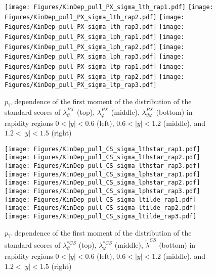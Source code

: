 \documentclass[12pt]{article}
\newcommand{\pT}{p_\mathrm{T}}
\newcommand{\absy}{\left |  y \right |}
\newcommand{\lamtildeCS}{\tilde{\lambda}^{\scriptscriptstyle CS}}
\newcommand{\lamthstarCS}{\lambda^{* \scriptscriptstyle CS}_\vartheta}
\newcommand{\lamphstarCS}{\lambda^{* \scriptscriptstyle CS}_\varphi}
\newcommand{\lamthPX}{\lambda^{\scriptscriptstyle PX}_\vartheta}
\newcommand{\lamphPX}{\lambda^{\scriptscriptstyle PX}_\varphi}
\newcommand{\lamthphPX}{\lambda^{\scriptscriptstyle PX}_{\vartheta \varphi}}
\begin{document}
\begin{figure}[htbp]
\centering
\texttt{[image: Figures/KinDep\_pull\_PX\_sigma\_lth\_rap1.pdf]}
\texttt{[image: Figures/KinDep\_pull\_PX\_sigma\_lth\_rap2.pdf]}
\texttt{[image: Figures/KinDep\_pull\_PX\_sigma\_lth\_rap3.pdf]}
\texttt{[image: Figures/KinDep\_pull\_PX\_sigma\_lph\_rap1.pdf]}
\texttt{[image: Figures/KinDep\_pull\_PX\_sigma\_lph\_rap2.pdf]}
\texttt{[image: Figures/KinDep\_pull\_PX\_sigma\_lph\_rap3.pdf]}
\texttt{[image: Figures/KinDep\_pull\_PX\_sigma\_ltp\_rap1.pdf]}
\texttt{[image: Figures/KinDep\_pull\_PX\_sigma\_ltp\_rap2.pdf]}
\texttt{[image: Figures/KinDep\_pull\_PX\_sigma\_ltp\_rap3.pdf]}
\caption{$\pT$ dependence of the first moment of the distribution of the
standard scores of $\lamthPX$ (top), $\lamphPX$ (middle), $\lamthphPX$ (bottom) in rapidity
regions $0<\absy<0.6$ (left), $0.6<\absy<1.2$ (middle), and $1.2<\absy<1.5$ (right)}
\end{figure}
\clearpage

\begin{figure}[htbp]
\centering
\texttt{[image: Figures/KinDep\_pull\_CS\_sigma\_lthstar\_rap1.pdf]}
\texttt{[image: Figures/KinDep\_pull\_CS\_sigma\_lthstar\_rap2.pdf]}
\texttt{[image: Figures/KinDep\_pull\_CS\_sigma\_lthstar\_rap3.pdf]}
\texttt{[image: Figures/KinDep\_pull\_CS\_sigma\_lphstar\_rap1.pdf]}
\texttt{[image: Figures/KinDep\_pull\_CS\_sigma\_lphstar\_rap2.pdf]}
\texttt{[image: Figures/KinDep\_pull\_CS\_sigma\_lphstar\_rap3.pdf]}
\texttt{[image: Figures/KinDep\_pull\_CS\_sigma\_ltilde\_rap1.pdf]}
\texttt{[image: Figures/KinDep\_pull\_CS\_sigma\_ltilde\_rap2.pdf]}
\texttt{[image: Figures/KinDep\_pull\_CS\_sigma\_ltilde\_rap3.pdf]}
\caption{$\pT$ dependence of the first moment of the distribution of the
standard scores of $\lamthstarCS$ (top), $\lamphstarCS$ (middle), $\lamtildeCS$ (bottom) in rapidity
regions $0<\absy<0.6$ (left), $0.6<\absy<1.2$ (middle), and $1.2<\absy<1.5$ (right)}
\end{figure}
\clearpage
\end{document}
